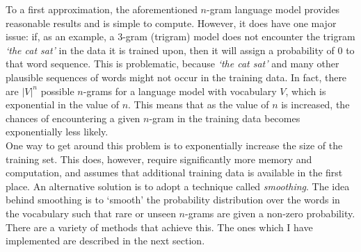 \documentclass[a4paper, 12pt]{report}
\newcommand{\tit}[1]{\textit{#1}}
\begin{document}
To a first approximation, the aforementioned $n$-gram language model provides reasonable results and is simple to compute. However, it does have one major issue: if, as an example, a 3-gram (trigram) model does not encounter the trigram \tit{`the cat sat'} in the data it is trained upon, then it will assign a probability of 0 to that word sequence. This is problematic, because \tit{`the cat sat'} and many other plausible sequences of words might not occur in the training data. In fact, there are $|V|^n$ possible $n$-grams for a language model with vocabulary $V$, which is exponential in the value of $n$. This means that as the value of $n$ is increased, the chances of encountering a given $n$-gram in the training data becomes exponentially less likely. \\

One way to get around this problem is to exponentially increase the size of the training set. This does, however, require significantly more memory and computation, and assumes that additional training data is available in the first place. An alternative solution is to adopt a technique called \tit{smoothing}. The idea behind smoothing is to `smooth' the probability distribution over the words in the vocabulary such that rare or unseen $n$-grams are given a non-zero probability. There are a variety of methods that achieve this. The ones which I have implemented are described in the next section. \\
\end{document}
